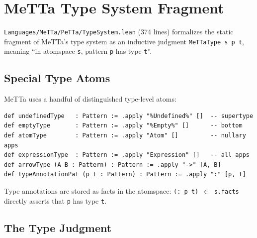 \documentclass[]{article}
\newcommand{\code}[1]{\texttt{#1}}
\begin{document}
\section{MeTTa Type System Fragment}
\label{sec:typesystem}

\code{Languages/MeTTa/PeTTa/TypeSystem.lean} (374 lines) formalizes the static fragment of
MeTTa's type system as an inductive judgment \code{MeTTaType s p t},
meaning ``in atomspace \code{s}, pattern \code{p} has type \code{t}''.

\subsection{Special Type Atoms}

MeTTa uses a handful of distinguished type-level atoms:

\begin{lstlisting}[language=lean]
def undefinedType   : Pattern := .apply "%Undefined%" []  -- supertype
def emptyType       : Pattern := .apply "%Empty%" []      -- bottom
def atomType        : Pattern := .apply "Atom" []         -- nullary apps
def expressionType  : Pattern := .apply "Expression" []   -- all apps
def arrowType (A B : Pattern) : Pattern := .apply "->" [A, B]
def typeAnnotationPat (p t : Pattern) : Pattern := .apply ":" [p, t]
\end{lstlisting}

Type annotations are stored as facts in the atomspace: \code{(: p t) $\in$ s.facts}
directly asserts that \code{p} has type \code{t}.

\subsection{The Type Judgment}
\end{document}
